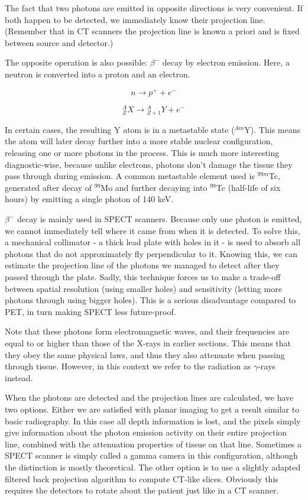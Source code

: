 The fact that two photons are emitted in opposite directions is very convenient.
If both happen to be detected, we immediately know their projection line.
(Remember that in CT scanners the projection line is known a priori and is fixed
between source and detector.)

The opposite operation is also possible: $\beta^-$ decay by electron emission.
Here, a neutron is converted into a proton and an electron.

\begin{equation}
	n \rightarrow p^+ + e^-
\end{equation}

\begin{equation}
	{}_Z^AX \rightarrow {}_{Z+1}^AY + e^-
\end{equation}

In certain cases, the resulting Y atom is in a metastable state ($^{Am}$Y).
This means the atom will later decay further into a more stable nuclear
configuration, releasing one or more photons in the process. This is much more
interesting diagnostic-wise, because unlike electrons, photons don't damage the
tissue they pass through during emission. A common metastable element
used is $^{99m}$Tc, generated after decay of $^{99}$Mo and further decaying
into $^{99}$Tc (half-life of six hours) by emitting a single photon of 140 keV.

$\beta^-$ decay is mainly used in SPECT scanners. Because only one photon is
emitted, we cannot immediately tell where it came from when it is detected. To
solve this, a mechanical collimator - a thick lead plate with holes in it - is
used to absorb all photons that do not approximately fly perpendicular to it.
Knowing this, we can estimate the projection line of the photons we managed to
detect after they passed through the plate. Sadly, this technique forces us to
make a trade-off between spatial resolution (using smaller holes) and
sensitivity (letting more photons through using bigger holes). This is a serious
disadvantage compared to PET, in turn making SPECT less future-proof.

Note that these photons form electromagnetic waves, and their frequencies are
equal to or higher than those of the X-rays in earlier sections. This means that
they obey the same physical laws, and thus they also attenuate when passing
through tissue. However, in this context we refer to the radiation as
$\gamma$-rays instead.

When the photons are detected and the projection lines are calculated, we have
two options. Either we are satisfied with planar imaging to get a result similar
to basic radiography. In this case all depth information is lost, and the pixels
simply give information about the photon emission activity on their entire
projection line, combined with the attenuation properties of tissue on that
line. Sometimes a SPECT scanner is simply called a gamma camera in this
configuration, although the distinction is mostly theoretical. The other option
is to use a slightly adapted filtered back projection algorithm to compute
CT-like slices. Obviously this requires the detectors to rotate about the
patient just like in a CT scanner.

